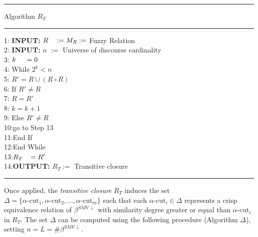 \documentclass[11pt, oneside]{Thesis} %
\begin{document}
\newpage
\noindent\rule[0.1cm]{\linewidth}{0.3pt}
\begin{center}
\vspace{-1cm}
Algorithm $R_T$
\end{center}
\vspace{-1cm}
\noindent\rule[0.1cm]{\linewidth}{0.3pt}
1: \hspace{0.3cm}\textbf{INPUT:} $R \hspace{0.33cm} := M_R :=$ Fuzzy Relation\\
2: \hspace{0.3cm}\textbf{INPUT:} $n$ \hspace{0.22cm} $:=$ Universe of discourse cardinality\\
3: \hspace{1cm}$k \hspace{0.47cm} = 0$\\
4: \hspace{1cm}While $2^{k} < n$\\
5: \hspace{1.6cm}$R' = R \cup (R \circ R)$\\
6: \hspace{1.6cm}If $R' \neq R$\\
7: \hspace{2.2cm}$R = R'$\\
8: \hspace{2.2cm}$k = k + 1$\\
9: \hspace{1.6cm}Else $R' \neq R$\\
10:\hspace{2.2cm}go to Step 13\\
11:\hspace{1.6cm}End If\\
12:\hspace{1cm}End While\\
13:\hspace{1cm}$R_{T} \hspace{0.3cm} = R'$\\
14:\hspace{0.25cm}\textbf{OUTPUT:} $R_{T} :=$ Transitive closure\\
\noindent\rule[0.1cm]{\linewidth}{0.3pt}

Once applied, the \textit{transitive closure} $R_T$ induces the set 
$\Delta = \lbrace \alpha\text{-cut}_1, \alpha\text{-cut}_2, ..., \alpha\text{-cut}_m 
\rbrace$ such that each $\alpha\text{-cut}_i \in \Delta$ represents a crisp equivalence 
relation of $\beta^{SMV\perp}$ with similarity degree greater or equal than 
$\alpha$-cut$_i$ in $R_T$. The set $\Delta$ can be computed using the following procedure 
(Algorithm $\Delta$), setting $n = L = \# \beta^{SMV\perp}$.
\end{document}
